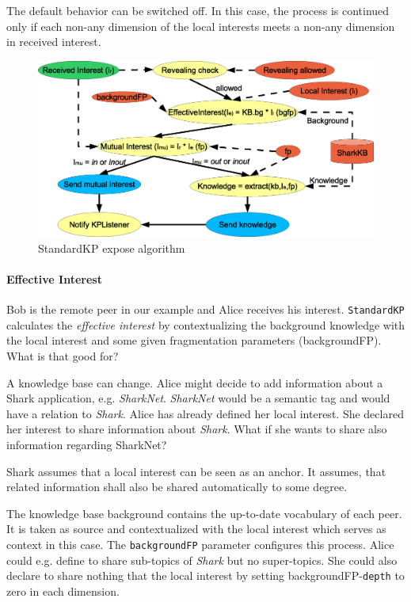 {The default behavior can be switched off. In this case, the process is continued only if each non-any dimension of the local interests meets a non-any dimension in received interest.

\begin{figure}[t]
\centering
\includegraphics[width=1.00\textwidth]{StandardKP_Expose.eps}
\caption{StandardKP expose algorithm}
\label{fig:StandardKP_expose}
\end{figure}

\paragraph{Effective Interest}
Bob is the remote peer in our example and Alice receives his interest. {\tt StandardKP} calculates the {\it effective interest} by contextualizing the background knowledge with the local interest and some given fragmentation parameters (backgroundFP). What is that good for?

A knowledge base can change. Alice might decide to add information about a Shark application, e.g. {\it SharkNet}. {\it SharkNet} would be a semantic tag and would have a relation to {\it Shark}. Alice has already defined her local interest. She declared her interest to share information about {\it Shark}. What if she wants to share also information regarding SharkNet? 

Shark assumes that a local interest can be seen as an anchor. It assumes, that related information shall also be shared automatically to some degree.

The knowledge base background contains the up-to-date vocabulary of each peer. It is taken as source and contextualized with the local interest which serves as context in this case. The {\tt backgroundFP} parameter configures this process. Alice could e.g. define to share sub-topics of {\it Shark} but no super-topics. She could also declare to share nothing that the local interest by setting backgroundFP-{\tt depth} to zero in each dimension. 

}
